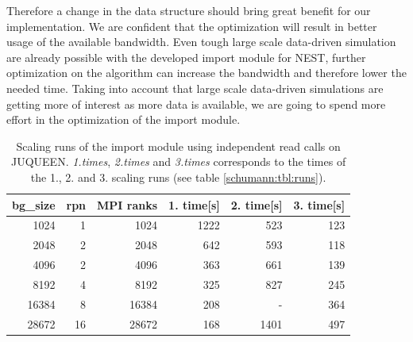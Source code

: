 Therefore a change in the data structure should bring great benefit for our implementation.
We are confident that the optimization will result in better usage of the available bandwidth.
Even tough large scale data-driven simulation are already possible with the developed import module for NEST,
further optimization on the algorithm can increase the bandwidth and therefore lower the needed time.
Taking into account that large scale data-driven simulations are getting more of interest as more 
data is available, we are going to spend more effort in the optimization of the import module.


\begin{table}[h!]
  \caption{Scaling runs of the import module using independent read calls on JUQUEEN. \emph{1.times}, \emph{2.times} and
  \emph{3.times} corresponds to the times of the 1., 2. and 3. scaling runs (see table \ref{schumann:tbl:runs}).}
\begin{center}
\begin{tabular}{|r|r|r|r|r|r|}
\hline
bg\_size& rpn & MPI ranks & 1. time[s] & 2. time[s] & 3. time[s] \\
\hline\hline
1024    &  1  & 1024      & 1222 & 523 & 123 \\
2048    &  2  & 2048      & 642  & 593 & 118 \\
4096    &  2  & 4096      & 363  & 661 & 139 \\
8192    &  4  & 8192     & 325  & 827 & 245 \\
16384   &  8  & 16384    & 208  & -   & 364 \\
28672   & 16  & 28672    & 168  & 1401& 497\\
\hline
\end{tabular}
\end{center}
\label{schumann:tbl:scalruns}
\end{table}

